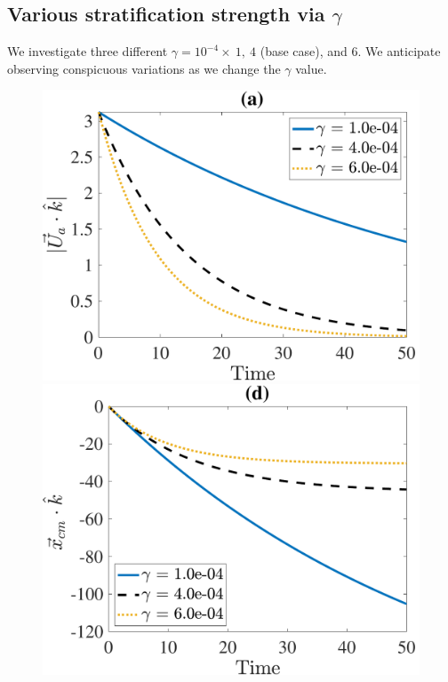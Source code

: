 \subsection{Various stratification strength via $\gamma$}
We investigate three different $\gamma = 10^{-4} \times \ 1, \ 4$ (base case), and $6$. We anticipate observing conspicuous variations as we change the $\gamma$ value. 
\begin{figure}[ht]
	\begin{center}
		\includegraphics[scale=0.35]{./figures/fig_NC50_g_Ua3_all}
		\includegraphics[scale=0.35]{./figures/fig_NC50_g_cm3_all}

\end{center}
\end{figure}
